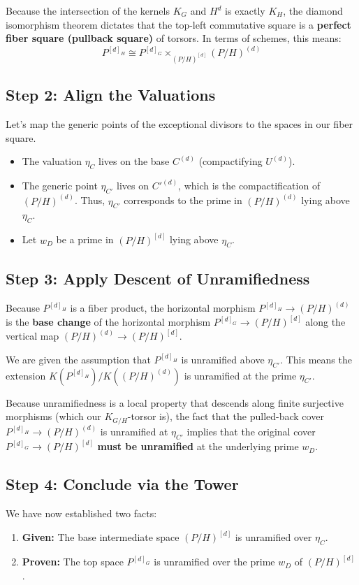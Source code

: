 Because the intersection of the kernels $K_G$ and $H^d$ is exactly $K_H$, the diamond isomorphism theorem dictates that the top-left commutative square is a \textbf{perfect fiber square (pullback square)} of torsors. In terms of schemes, this means:
\[
P^{[d]_H} \cong P^{[d]_G} \times_{(P/H)^{[d]}} (P/H)^{(d)}
\]

\subsection*{Step 2: Align the Valuations}
Let's map the generic points of the exceptional divisors to the spaces in our fiber square.
\begin{itemize}
    \item The valuation $\eta_C$ lives on the base $C^{(d)}$ (compactifying $U^{(d)}$).
    \item The generic point $\eta_{C'}$ lives on $C'^{(d)}$, which is the compactification of $(P/H)^{(d)}$. Thus, $\eta_{C'}$ corresponds to the prime in $(P/H)^{(d)}$ lying above $\eta_C$.
    \item Let $w_D$ be a prime in $(P/H)^{[d]}$ lying above $\eta_C$.
\end{itemize}

\subsection*{Step 3: Apply Descent of Unramifiedness}
Because $P^{[d]_H}$ is a fiber product, the horizontal morphism $P^{[d]_H} \to (P/H)^{(d)}$ is the \textbf{base change} of the horizontal morphism $P^{[d]_G} \to (P/H)^{[d]}$ along the vertical map $(P/H)^{(d)} \to (P/H)^{[d]}$.

We are given the assumption that $P^{[d]_H}$ is unramified above $\eta_{C'}$. This means the extension $K(P^{[d]_H}) / K((P/H)^{(d)})$ is unramified at the prime $\eta_{C'}$. 

Because unramifiedness is a local property that descends along finite surjective morphisms (which our $K_{G/H}$-torsor is), the fact that the pulled-back cover $P^{[d]_H} \to (P/H)^{(d)}$ is unramified at $\eta_{C'}$ implies that the original cover $P^{[d]_G} \to (P/H)^{[d]}$ \textbf{must be unramified} at the underlying prime $w_D$. 

\subsection*{Step 4: Conclude via the Tower}
We have now established two facts:
\begin{enumerate}
    \item \textbf{Given:} The base intermediate space $(P/H)^{[d]}$ is unramified over $\eta_C$.
    \item \textbf{Proven:} The top space $P^{[d]_G}$ is unramified over the prime $w_D$ of $(P/H)^{[d]}$.
\end{enumerate}

